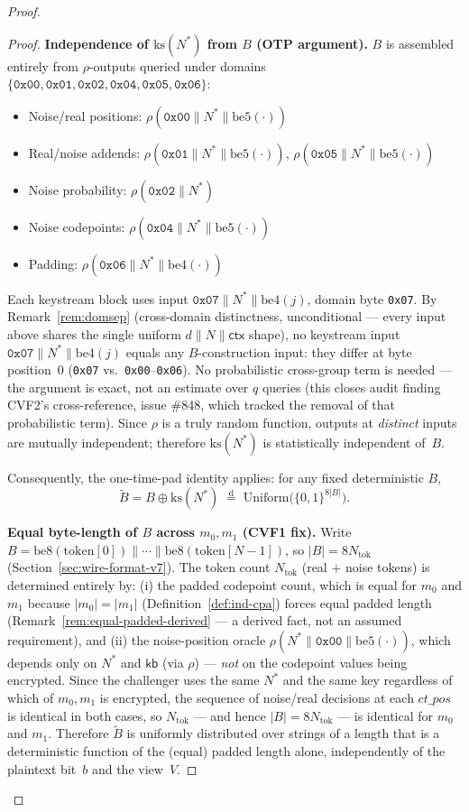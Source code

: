 \documentclass[11pt,a4paper]{article}
\begin{document}
\begin{proof}
\begin{proof}
\smallskip
\noindent\textbf{Independence of $\mathrm{ks}(N^*)$ from $B$ (OTP argument).}
$B$ is assembled entirely from $\rho$-outputs queried under domains
$\{\texttt{0x00},\texttt{0x01},\texttt{0x02},\texttt{0x04},\texttt{0x05},\texttt{0x06}\}$:
\begin{itemize}
  \item Noise/real positions: $\rho(\texttt{0x00}\|N^*\|\mathrm{be5}(\cdot))$
  \item Real/noise addends: $\rho(\texttt{0x01}\|N^*\|\mathrm{be5}(\cdot))$,
        $\rho(\texttt{0x05}\|N^*\|\mathrm{be5}(\cdot))$
  \item Noise probability: $\rho(\texttt{0x02}\|N^*)$
  \item Noise codepoints: $\rho(\texttt{0x04}\|N^*\|\mathrm{be5}(\cdot))$
  \item Padding: $\rho(\texttt{0x06}\|N^*\|\mathrm{be4}(\cdot))$
\end{itemize}
Each keystream block uses input $\texttt{0x07}\|N^*\|\mathrm{be4}(j)$, domain
byte \texttt{0x07}.
By Remark~\ref{rem:domsep} (cross-domain distinctness, unconditional — every
input above shares the single uniform $d\|N\|\mathsf{ctx}$ shape), no
keystream input $\texttt{0x07}\|N^*\|\mathrm{be4}(j)$ equals any $B$-construction
input: they differ at byte position~$0$ (\texttt{0x07} vs.\ \texttt{0x00}--\texttt{0x06}).
No probabilistic cross-group term is needed — the argument is exact, not an
estimate over $q$ queries (this closes audit finding CVF2's cross-reference,
issue \#848, which tracked the removal of that probabilistic term).
Since $\rho$ is a truly random function, outputs at \emph{distinct} inputs
are mutually independent; therefore
$\mathrm{ks}(N^*)$ is statistically independent of~$B$.

Consequently, the one-time-pad identity applies: for any fixed deterministic $B$,
\[
  \tilde{B}
  = B \oplus \mathrm{ks}(N^*)
  \;\overset{\mathrm{d}}{=}\;
  \mathrm{Uniform}\bigl(\{0,1\}^{8|B|}\bigr).
\]

\smallskip
\noindent\textbf{Equal byte-length of $B$ across $m_0, m_1$ (CVF1 fix).}
Write $B = \mathrm{be8}(\mathrm{token}[0]) \| \cdots \| \mathrm{be8}(\mathrm{token}[N-1])$, so
$|B| = 8N_{\mathrm{tok}}$ (Section~\ref{sec:wire-format-v7}). The token count
$N_{\mathrm{tok}}$ (real $+$ noise tokens) is determined entirely by: (i) the padded codepoint count,
which is equal for $m_0$ and $m_1$ because $|m_0|=|m_1|$
(Definition~\ref{def:ind-cpa}) forces equal padded length
(Remark~\ref{rem:equal-padded-derived} --- a derived fact, not an assumed
requirement), and (ii) the noise-position oracle
$\rho(N^*\|\texttt{0x00}\|\mathrm{be5}(\cdot))$, which depends only on
$N^*$ and $\mathsf{kb}$ (via $\rho$) --- \emph{not} on the codepoint values
being encrypted. Since the challenger uses the same $N^*$ and the same key
regardless of which of $m_0, m_1$ is encrypted, the sequence of
noise/real decisions at each $ct\_pos$ is identical in both cases, so
$N_{\mathrm{tok}}$ --- and hence $|B| = 8N_{\mathrm{tok}}$ --- is identical for $m_0$ and $m_1$. Therefore $\tilde{B}$
is uniformly distributed over strings of a length that is a deterministic
function of the (equal) padded length alone, independently of the
plaintext bit~$b$ and the view~$V$.


\end{proof}
\end{proof}
\end{document}
